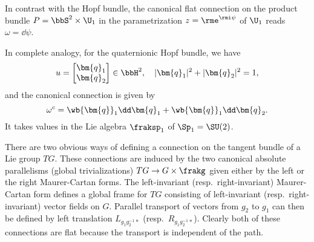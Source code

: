\begin{example}
    In contrast with the Hopf bundle, the canonical flat connection on the product bundle $P=\bbS^2\times\U_1$ in the parametrization $z=\rme^{\rmi \psi}$ of $\U_1$ reads $\omega=\dd\psi$.

    In complete analogy, for the quaternionic Hopf bundle, we have
    \[u=\begin{bmatrix}
        \bm{q}_1\\\bm{q}_2
    \end{bmatrix}
    \in\bbH^2, \quad |\bm{q}_1|^2 +|\bm{q}_2|^2=1,\]
    and the canonical connection is given by
    \[\omega^c=\wb{\bm{q}}_1\dd\bm{q}_1+\wb{\bm{q}}_1\dd \bm{q}_2.\]
    It takes values in the Lie algebra $\fraksp_1$ of $\Sp_1=\SU(2)$.

\end{example}


\begin{example}\label{ex connections on G, part 1}
    There are two obvious ways of defining a connection on the tangent bundle of a Lie group $TG$. These connections are induced by the two canonical absolute parallelisms (global trivializations) $TG\to G\times\frakg$ given either by the left or the right Maurer-Cartan forms. The left-invariant (resp.\ right-invariant) Maurer-Cartan form defines a global frame for $TG$ consisting of left-invariant (resp.\ right-invariant) vector fields on $G$. Parallel transport of vectors from $g_2$ to $g_1$ can then be defined by left translation $L_{g_1g_2^{-1}\ast}$ (resp.\ $R_{g_1g_2^{-1}\ast}$). Clearly both of these connections are flat because the transport is independent of the path.


\end{example}
